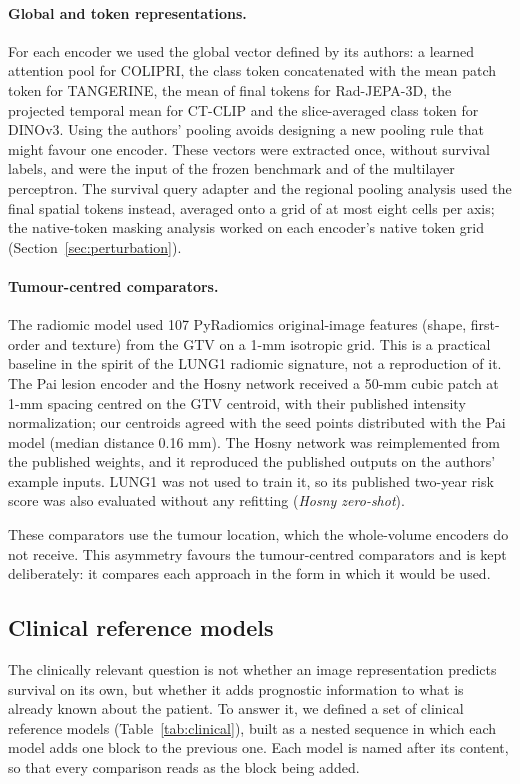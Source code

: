 \paragraph{Global and token representations.} For each encoder we used the global vector defined by its authors: a learned attention pool for COLIPRI, the class token concatenated with the mean patch token for TANGERINE, the mean of final tokens for Rad-JEPA-3D, the projected temporal mean for CT-CLIP and the slice-averaged class token for DINOv3. Using the authors' pooling avoids designing a new pooling rule that might favour one encoder. These vectors were extracted once, without survival labels, and were the input of the frozen benchmark and of the multilayer perceptron. The survival query adapter and the regional pooling analysis used the final spatial tokens instead, averaged onto a grid of at most eight cells per axis; the native-token masking analysis worked on each encoder's native token grid (Section~\ref{sec:perturbation}).

\paragraph{Tumour-centred comparators.} The radiomic model used 107 PyRadiomics original-image features (shape, first-order and texture) from the GTV on a 1-mm isotropic grid. This is a practical baseline in the spirit of the LUNG1 radiomic signature, not a reproduction of it.\cite{aerts2014} The Pai lesion encoder and the Hosny network received a 50-mm cubic patch at 1-mm spacing centred on the GTV centroid, with their published intensity normalization; our centroids agreed with the seed points distributed with the Pai model (median distance 0.16 mm). The Hosny network was reimplemented from the published weights, and it reproduced the published outputs on the authors' example inputs. LUNG1 was not used to train it, so its published two-year risk score was also evaluated without any refitting (\emph{Hosny zero-shot}).

These comparators use the tumour location, which the whole-volume encoders do not receive. This asymmetry favours the tumour-centred comparators and is kept deliberately: it compares each approach in the form in which it would be used.

\subsection{Clinical reference models}\label{sec:clinical}
The clinically relevant question is not whether an image representation predicts survival on its own, but whether it adds prognostic information to what is already known about the patient. To answer it, we defined a set of clinical reference models (Table~\ref{tab:clinical}), built as a nested sequence in which each model adds one block to the previous one. Each model is named after its content, so that every comparison reads as the block being added.

